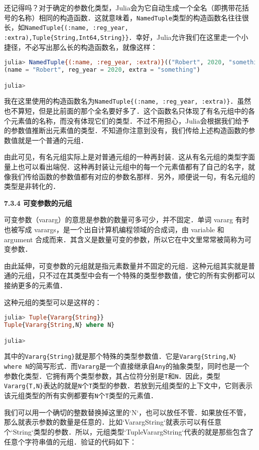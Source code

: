 还记得吗？对于确定的参数化类型，Julia会为它自动生成一个全名（即携带花括号的名称）相同的构造函数．这就意味着，\verb|NamedTuple|类型的构造函数名往往很长，如\verb|NamedTuple{(:name, :reg_year, :extra),Tuple{String,Int64,String}}|．幸好，Julia允许我们在这里走一个小捷径，不必写出那么长的构造函数名，就像这样：
\begin{lstlisting}[language=julia]
julia> NamedTuple{(:name, :reg_year, :extra)}(("Robert", 2020, "something"))
(name = "Robert", reg_year = 2020, extra = "something")

julia> 
\end{lstlisting}

我在这里使用的构造函数名为\verb|NamedTuple{(:name, :reg_year, :extra)}|．虽然也不算短，但是比前面的那个全名要好多了．这个函数名只体现了有名元组中的各个元素值的名称，而没有体现它们的类型．不过不用担心，Julia会根据我们给予的参数值推断出元素值的类型．不知道你注意到没有，我们传给上述构造函数的参数值就是一个普通的元组．

由此可见，有名元组实际上是对普通元组的一种再封装．这从有名元组的类型字面量上也可以看出端倪．这种再封装让元组中的每一个元素值都有了自己的名字，就像我们传给函数的参数值都有对应的参数名那样．另外，顺便说一句，有名元组的类型是非转化的．

\textbf{7.3.4 可变参数的元组}

可变参数（vararg）的意思是参数的数量可多可少，并不固定．单词 vararg 有时也被写成 varargs，是一个出自计算机编程领域的合成词，由 variable 和 argument 合成而来．其含义是数量可变的参数，所以它在中文里常常被简称为可变参数．

由此延伸，可变参数的元组就是指元素数量并不固定的元组．这种元组其实就是普通的元组，只不过在其类型中会有一个特殊的类型参数值，使它的所有实例都可以接纳更多的元素值．

这种元组的类型可以是这样的：
\begin{lstlisting}[language=julia]
julia> Tuple{Vararg{String}}
Tuple{Vararg{String,N} where N}

julia> 
\end{lstlisting}

其中的\verb|Vararg{String}|就是那个特殊的类型参数值．它是\verb|Vararg{String,N} where N|的简写形式．而\verb|Vararg|是一个直接继承自\verb|Any|的抽象类型，同时也是一个参数化类型．它拥有两个类型参数，其占位符分别是\verb|T|和\verb|N|．因此，类型\verb|Vararg{T,N}|表达的就是\verb|N|个\verb|T|类型的参数．若放到元组类型的上下文中，它则表示该元组类型的所有实例都要有\verb|N|个\verb|T|类型的元素值．

我们可以用一个确切的整数替换掉这里的`N`，也可以放任不管．如果放任不管，那么就表示参数的数量是任意的．比如`Vararg{String}`就表示可以有任意个`String`类型的参数．所以，元组类型`Tuple{Vararg{String}}`代表的就是那些包含了任意个字符串值的元组．验证的代码如下：

